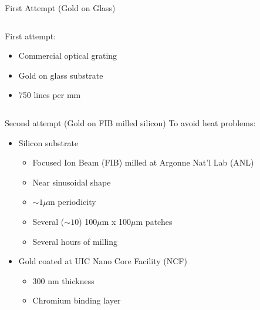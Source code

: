 \begin{frame}{First Attempt (Gold on Glass)}
  \begin{columns}
    \begin{column}{0.49\linewidth}
      First attempt:
      \begin{itemize}
        \item Commercial optical grating
        \item Gold on glass substrate
        \item 750 lines per mm
      \end{itemize}
    \end{column}
    \begin{column}{0.49\linewidth}
      \begin{figure}
        \centering
      \end{figure}
    \end{column}
  \end{columns}
\end{frame}

\begin{frame}{Second attempt (Gold on FIB milled silicon)}
  To avoid heat problems:
  \begin{itemize}
    \item Silicon substrate
    \begin{itemize}
      \item<2-> Focused Ion Beam (FIB) milled at Argonne Nat'l Lab (ANL)
      \item<3-> Near sinusoidal shape
      \item<3-> $\sim 1 \mu$m periodicity
      \item<4-> Several ($\sim10$) 100$\mu$m x 100$\mu$m patches
      \item<4-> Several hours of milling
    \end{itemize}
    \item<5-> Gold coated at UIC Nano Core Facility (NCF)
    \begin{itemize}
      \item<6-> 300 nm thickness
      \item<6-> Chromium binding layer
    \end{itemize}
  \end{itemize}
  
\end{frame}

